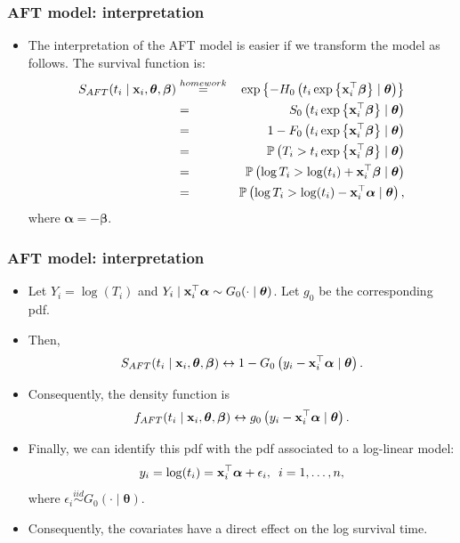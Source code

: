 \documentclass[10pt,handout,compress]{beamer}
\newcommand{\balpha}{\bm{\alpha}}
\newcommand{\bbeta}{\bm{\beta}}
\newcommand{\btheta}{\bm{\theta}}
\newcommand{\bx}{{\bf x}}
\begin{document}
\begin{frame}
\frametitle{AFT model: interpretation}
\begin{itemize}
\item The interpretation of the AFT model is easier if we transform the model as follows. The survival function is:
\begin{eqnarray*}
S_{AFT}(t_i \mid \bx_i, \btheta,\bbeta) &\stackrel{\tiny homework}{=}& \exp \left\{- H_0\left(t_i  \exp\left\{ \bx_i ^{\top}\bbeta\right\}\mid \btheta\right) \right\} \\
 &=& S_0\left(t_i  \exp\left\{ \bx_i ^{\top}\bbeta\right\}\mid \btheta\right)\\
 &=& 1-F_0\left(t_i  \exp\left\{ \bx_i ^{\top}\bbeta\right\}\mid \btheta\right)\\
 &=& {\mathbb P}  \left( T_i > t_i  \exp\left\{ \bx_i ^{\top}\bbeta\right\}\mid \btheta\right)\\
 &=& {\mathbb P}  \left(\log T_i > \log(t_i)  + \bx_i ^{\top}\bbeta \mid \btheta\right)\\
 &=& {\mathbb P}  \left(\log T_i > \log(t_i)  - \bx_i ^{\top}\balpha \mid \btheta\right),
\end{eqnarray*}
where $\balpha = -\bbeta$.
\end{itemize}
\end{frame}

\begin{frame}
\frametitle{AFT model: interpretation}
\begin{itemize}
\item Let $Y_i = \log(T_i)$ and  $Y_i \mid   \bx_i ^{\top}\balpha  \sim G_0(\cdot \mid \btheta)$. Let $g_0$ be the corresponding pdf.
\pause 
\item  Then,
\begin{eqnarray*}
S_{AFT}(t_i \mid \bx_i, \btheta,\bbeta) \leftrightarrow 1-G_0\left( y_i   - \bx_i ^{\top}\balpha \mid \btheta\right).
\end{eqnarray*}
\pause
\item Consequently, the density function is 
\begin{eqnarray*}
f_{AFT}(t_i \mid \bx_i, \btheta,\bbeta) \leftrightarrow  g_0\left( y_i   - \bx_i^{\top}\balpha \mid \btheta\right).
\end{eqnarray*}
\pause
\item Finally, we can identify this pdf with the pdf associated to a log-linear model:
\begin{eqnarray*}
y_i = \log(t_i) =  \bx_i ^{\top}\balpha + \epsilon_i, \,\,\, i=1,\dots,n,
\end{eqnarray*}
where $\epsilon_i \stackrel{iid}{\sim} G_0(\cdot \mid \btheta)$. \pause
\item Consequently, the covariates have a direct effect on the log survival time.

\end{itemize}
\end{frame}
\end{document}
